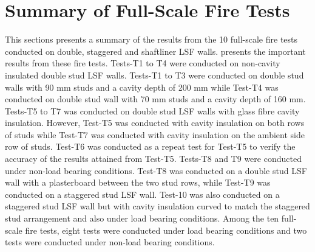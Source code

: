 \section{Summary of Full-Scale Fire Tests}

This sections presents a summary of the results from the 10 full-scale fire tests conducted on double, staggered and shaftliner LSF walls.  presents the important results from these fire tests. Tests-T1 to T4 were conducted on non-cavity insulated double stud LSF walls. Tests-T1 to T3 were conducted on double stud walls with 90 mm studs and a cavity depth of 200 mm while Test-T4 was conducted on double stud wall with 70 mm studs and a cavity depth of 160 mm. Tests-T5 to T7 was conducted on double stud LSF walls with glass fibre cavity insulation. However, Test-T5 was conducted with cavity insulation on both rows of studs while Test-T7 was conducted with cavity insulation on the ambient side row of studs. Test-T6 was conducted as a repeat test for Test-T5 to verify the accuracy of the results attained from Test-T5. Tests-T8 and T9 were conducted under non-load bearing conditions. Test-T8 was conducted on a double stud LSF wall with a plasterboard between the two stud rows, while Test-T9 was conducted on a staggered stud LSF wall. Test-10 was also conducted on a staggered stud LSF wall but with cavity insulation curved to match the staggered stud arrangement and also under load bearing conditions. Among the ten full-scale fire tests, eight tests were conducted under load bearing conditions and two tests were conducted under non-load bearing conditions.
